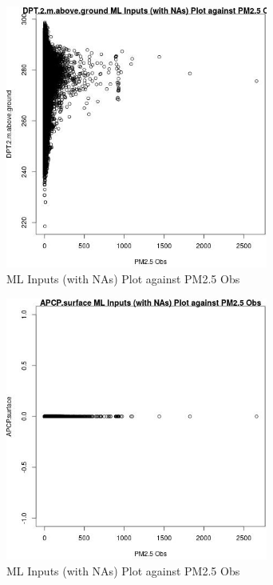 \begin{figure} 
\centering  
\includegraphics[width=0.77\textwidth]{Code_Outputs/Report_ML_input_PM25_Step4_part_e_de_duplicated_aves_compiled_2019-05-21wNAs_DPT2mabovegroundvPM25_Obs.jpg} 
\caption{\label{fig:Report_ML_input_PM25_Step4_part_e_de_duplicated_aves_compiled_2019-05-21wNAsDPT2mabovegroundvPM25_Obs}ML Inputs (with NAs) Plot against PM2.5 Obs} 
\end{figure} 
 

\begin{figure} 
\centering  
\includegraphics[width=0.77\textwidth]{Code_Outputs/Report_ML_input_PM25_Step4_part_e_de_duplicated_aves_compiled_2019-05-21wNAs_APCPsurfacevPM25_Obs.jpg} 
\caption{\label{fig:Report_ML_input_PM25_Step4_part_e_de_duplicated_aves_compiled_2019-05-21wNAsAPCPsurfacevPM25_Obs}ML Inputs (with NAs) Plot against PM2.5 Obs} 
\end{figure} 
 

